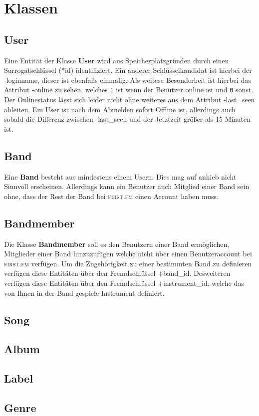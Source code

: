 \documentclass[11pt,a4paper,DIV=9]{scrartcl}
\begin{document}
\section{Klassen}
  \subsection{User}
    Eine Entität der Klasse \textbf{User} wird aus Speicherplatzgründen durch einen Surrogatschlüssel (*id) identifiziert. Ein anderer Schlüsselkandidat ist hierbei der -loginname, dieser ist ebenfalls einmalig. Als weitere Besonderheit ist hierbei das Attribut -online zu sehen, welches \texttt{1} ist wenn der Benutzer online ist und \texttt{0} sonst. Der Onlinestatus lässt sich leider nicht ohne weiteres aus dem Attribut -last\_seen ableiten. Ein User ist nach dem Abmelden sofort Offline ist, allerdings auch sobald die Differenz zwischen -last\_seen und der Jetztzeit größer als 15 Minuten ist.
  \subsection{Band}
    Eine \textbf{Band} besteht aus mindestens einem Usern. Dies mag auf anhieb nicht Sinnvoll erscheinen. Allerdings kann ein Benutzer auch Mitglied einer Band sein ohne, dass der Rest der Band bei \textsc{first.fm} einen Account haben muss. 
  \subsection{Bandmember}
    Die Klasse \textbf{Bandmember} soll es den Benutzern einer Band ermöglichen, Mitglieder einer Band hinzuzufügen welche nicht über einen Benutzeraccount bei \textsc{first.fm} verfügen. Um die Zugehörigkeit zu einer bestimmten Band zu definieren verfügen diese Entitäten über den Fremdschlüssel +band\_id. Desweiteren verfügen diese Entitäten über den Fremdschlüssel +instrument\_id, welche das von Ihnen in der Band gespiele Instrument definiert.
  \subsection{Song}
  \subsection{Album}
  \subsection{Label}
  \subsection{Genre}
\end{document}
